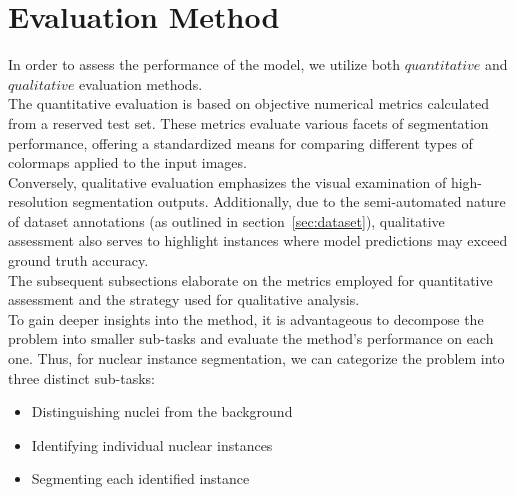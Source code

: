 \documentclass[target=bach,aauheader=,style=]{thud}
\begin{document}
\section{Evaluation Method}
In order to assess the performance of the model, we utilize both $quantitative$ and $qualitative$ evaluation methods.\\
The quantitative evaluation is based on objective numerical metrics calculated from a reserved test set. These metrics evaluate various facets of segmentation performance, offering a standardized means for comparing different types of colormaps applied to the input images.\\
Conversely, qualitative evaluation emphasizes the visual examination of high-resolution segmentation outputs. Additionally, due to the semi-automated nature of dataset annotations (as outlined in section~\ref{sec:dataset}), qualitative assessment also serves to highlight instances where model predictions may exceed ground truth accuracy.\\
The subsequent subsections elaborate on the metrics employed for quantitative assessment and the strategy used for qualitative analysis.\\
To gain deeper insights into the method, it is advantageous to decompose the problem into smaller sub-tasks and evaluate the method's performance on each one. Thus, for nuclear instance segmentation, we can categorize the problem into three distinct sub-tasks:
\begin{itemize}
    \item Distinguishing nuclei from the background
    \item Identifying individual nuclear instances
    \item Segmenting each identified instance
\end{itemize}
\end{document}
